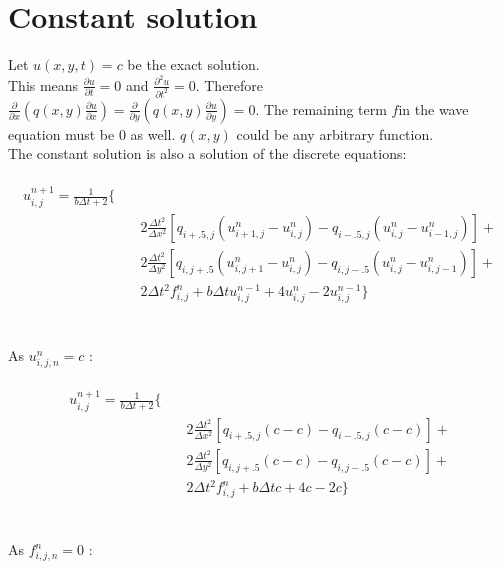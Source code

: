 \documentclass{report}
\begin{document}
        \section*{Constant solution}
        Let $u(x, y, t) = c$ be the exact solution. \\ This means $\frac{\partial u}{\partial t}=0$ and $\frac{\partial^2 u}{\partial t^2}=0$. Therefore $\frac{\partial}{\partial x}(q(x, y)\frac{\partial u}{\partial x})=\frac{\partial}{\partial y}(q(x, y)\frac{\partial u}{\partial y})=0$. The remaining term $f$in the wave equation must be $0$ as well. $q(x,y)$ could be any arbitrary function.
        \\The constant solution is also a solution of the discrete equations:\\\\
        \begin{equation}
        \begin{split}
        u^{n+1}_{i,j}= \frac{1}{b \Delta t + 2} \{\\  
        &\quad 2 \frac{\Delta t^2}{\Delta x^2}[q_{i+.5,j}(u^{n}_{i+1,j}-u^{n}_{i,j})-q_{i-.5,j}(u^{n}_{i,j}-u^{n}_{i-1,j})] + \\
        &\quad 2 \frac{\Delta t^2}{\Delta y^2}[q_{i,j+.5}(u^{n}_{i,j+1}-u^{n}_{i,j})-q_{i,j-.5}(u^{n}_{i,j}-u^{n}_{i,j-1})]+ \\
        &\quad  2\Delta t^2 f^{n}_{i,j} + b \Delta t u^{n-1}_{i,j}+4 u^{n}_{i,j}-2u^{n-1}_{i,j} \}
        \end{split}
        \end{equation}
        \\\\As $u^{n}_{i,j,n}=c$ :\\\\
        \begin{equation}
        \begin{split}
        u^{n+1}_{i,j} = \frac{1}{b \Delta t + 2} \{\\ 
        &\quad  2 \frac{\Delta t^2}{\Delta x^2}[q_{i+.5,j}(c-c)-q_{i-.5,j}(c-c)] + \\
        &\quad  2 \frac{\Delta t^2}{\Delta y^2}[q_{i,j+.5}(c-c)-q_{i,j-.5}(c-c)]+ \\
        &\quad  2\Delta t^2 f^{n}_{i,j} + b \Delta t c+4 c-2c \}
        \end{split}
        \end{equation}
        \\\\As $f^{n}_{i,j,n}=0$ :\\
\end{document}
